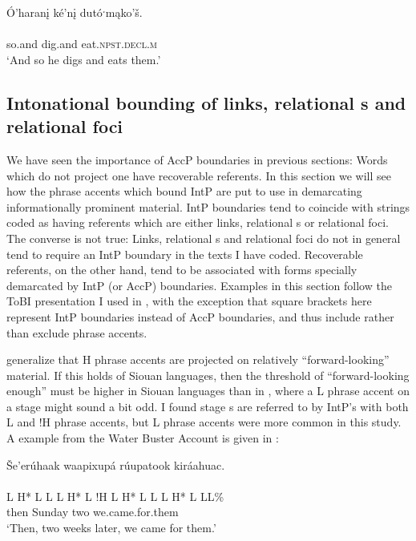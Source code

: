 \documentclass[output=paper]{LSP/langsci}
\begin{document}
\ea\label{ruetazero}
 	Ó’haranį ké’nį dutóˑmąko’š.\rmfnm\\
\gll 	{}			\\
	so.and		dig.and		eat.\textsc{npst.decl.m}\\
\glt	`And so he digs and eats them.'
\z

\subsection{Intonational bounding of links, relational s and relational foci}\label{intonationalbounding}
	
	We have seen the importance of AccP boundaries in previous sections: Words which do not project one have recoverable referents. In this section we will see how the phrase accents which bound IntP are put to use in demarcating informationally prominent material. IntP boundaries tend to coincide with strings coded as having referents which are either links, relational s or relational foci. The converse is not true: Links, relational s and relational foci do not in general tend to require an IntP boundary in the texts I have coded. Recoverable referents, on the other hand, tend  to be associated with forms specially demarcated by IntP (or AccP) boundaries. Examples in this section follow the ToBI presentation I used in , with the exception that square brackets here represent IntP boundaries instead of AccP boundaries, and thus include rather than exclude phrase accents.
	
	\citet{PierrehumbertHirschberg1990} generalize that H phrase accents are projected on relatively “forward-looking” material. If this holds of Siouan languages, then the threshold of “forward-looking enough” must be higher in Siouan languages than in , where a L phrase accent on a stage  might sound a bit odd. I found stage s are referred to by IntP’s with both L and !H phrase accents, but L phrase accents were more common in this study. A  example from the Water Buster Account is given in :

	\newpage 
\ea\label{waterbusterstagetopic}
Še’erúhaak waapixupá rúupatook kiráahuac.\rmfnm\\
\glll	{}					\\
	{\ob L H* L L\cb}		{\ob L H* L !H\cb}		{\ob L H* L L\cb}		{\ob L H* L L\cb{}L\%}\\
	then				Sunday			two				we.came.for.them\\
\glt	`Then, two weeks later, we came for them.'
\z
\end{document}
